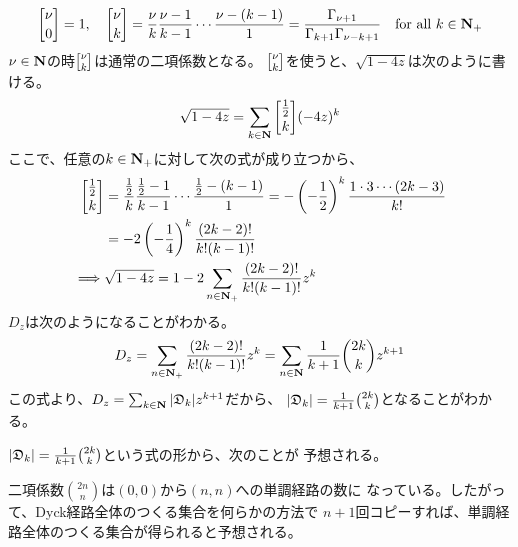 {	\begin{equation*}\begin{split}
		\cbinom{\nu}{0} = 1,\quad
		\cbinom{\nu}{k} = \frac{\nu}{k}\frac{\nu-1}{k-1}
			\cdots\frac{\nu-(k-1)}{1}
		= \frac{\Gamma_{\nu+1}}{\Gamma_{k+1}\Gamma_{\nu-k+1}}
		\quad\text{for all } k\in\sizen_+
	\end{split}\end{equation*}
	$\nu\in\mathbf{N}$の時$\cbinom{\nu}{k}$は通常の二項係数となる。
	$\cbinom{\nu}{k}$を使うと、$\sqrt{1-4z}$は次のように書ける。
	\begin{equation*}\begin{split}
		\sqrt{1-4z} = \sum_{k\in\sizen} \cbinom{\frac{1}{2}}{k} (-4z)^k
	\end{split}\end{equation*}
	ここで、任意の$k\in\mathbf{N}_+$に対して次の式が成り立つから、
	\begin{equation*}\begin{split}
		\cbinom{\frac{1}{2}}{k}
		&= \frac{\frac{1}{2}}{k}\frac{\frac{1}{2}-1}{k-1}
			\cdots\frac{\frac{1}{2}-(k-1)}{1}
		= -\left(-\frac{1}{2}\right)^k\frac{1\cdot3\cdots(2k-3)}{k!} \\
		&= -2\left(-\frac{1}{4}\right)^k \frac{(2k-2)!}{k!(k-1)!} \\
		\implies & \sqrt{1-4z} = 1 - 2\sum_{n\in\sizen_+}
			\frac{(2k-2)!}{k!(k-1)!} z^k \\
	\end{split}\end{equation*}
	$D_z$は次のようになることがわかる。
	\begin{equation*}\begin{split}
		D_z = \sum_{n\in\mathbf{N}_+} \frac{(2k-2)!}{k!(k-1)!} z^k
		= \sum_{n\in\mathbf{N}} \frac{1}{k+1} \binom{2k}{k} z^{k+1}
	\end{split}\end{equation*}
	この式より、$D_z=\sum_{k\in\mathbf{N}}|{\mathfrak D}_k|z^{k+1}$だから、
	$|{\mathfrak D}_k|=\frac{1}{k+1}\binom{2k}{k}$となることがわかる。

	$|{\mathfrak D}_k|=\frac{1}{k+1}\binom{2k}{k}$という式の形から、次のことが
	予想される。

	\begin{observation}[Dyck経路の数と単調経路の数]
	\label{obs:Dyck経路の数と単調経路の数} %
		二項係数$\binom{2n}{n}$は$(0,0)$から$(n,n)$への単調経路の数に
		なっている。したがって、Dyck経路全体のつくる集合を何らかの方法で
		$n+1$回コピーすれば、単調経路全体のつくる集合が得られると予想される。
	\end{observation} %

}
